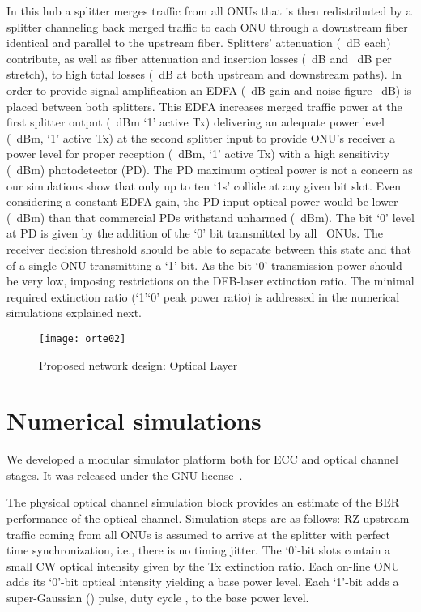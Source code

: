 \documentclass[10pt]{article}
\begin{document}
In this hub a  splitter merges traffic from all ONUs that is then redistributed by a  splitter channeling back merged traffic to each ONU through a downstream fiber identical and parallel to the upstream fiber.
Splitters' attenuation (~dB each) contribute, as well as fiber attenuation and insertion losses (~dB and ~dB per stretch), to high total losses (~dB at both upstream and downstream paths).
In order to provide signal amplification an EDFA (~dB gain and noise figure ~dB) is placed between both splitters.
This EDFA increases merged traffic power at the first splitter output (~dBm `1' active Tx) delivering an adequate power level (~dBm, `1' active Tx) at the second splitter input to provide ONU's receiver a power level for proper reception (~dBm, `1' active Tx) with a high sensitivity (~dBm) photodetector (PD).
The PD maximum optical power is not a concern as our simulations show that only up to ten `1s' collide at any given bit slot.
Even considering a constant EDFA gain, the PD input optical power would be lower (~dBm) than that commercial PDs withstand unharmed (~dBm).
The bit `0' level at PD is given by the addition of the `0' bit transmitted 
by all ~ONUs.
The receiver decision threshold should be able to separate between this state and that of a single ONU transmitting a `1' bit.
As the bit `0' transmission power should be very low, imposing
restrictions on the DFB-laser extinction ratio.
The minimal required extinction ratio (`1'`0' peak power ratio) is addressed in the numerical simulations explained next.
\begin{figure}[!t]
  \centering
    \texttt{[image: orte02]}
    \caption{Proposed network design: Optical Layer}
    \label{arch:fig1}
\end{figure}


\section{Numerical simulations}
We developed a modular simulator platform both for ECC and optical channel stages.
It was released under the GNU license~\cite{sim1}.

The physical optical channel simulation block provides an estimate of
the BER performance of the optical channel. Simulation steps are as
follows: RZ upstream traffic coming from all ONUs is assumed to arrive
at the  splitter with perfect time synchronization, i.e., there is no timing jitter. 
The `0'-bit slots contain a small CW optical intensity given by the Tx extinction ratio. 
Each on-line ONU adds its `0'-bit optical intensity yielding a base power level.
Each `1'-bit adds a super-Gaussian () pulse, duty cycle , to the base power level. 
 
\end{document}
